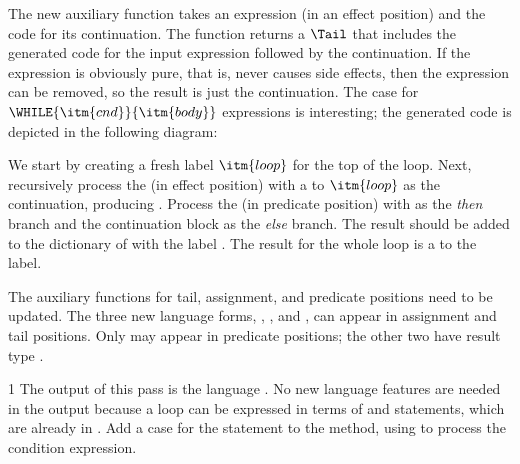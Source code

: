 \documentclass[7x10]{TimesAPriori_MIT}%
\def\pythonEd{1}
\def\edition{0}
\numberwithin{theorem}{chapter}
\numberwithin{definition}{chapter}
\numberwithin{equation}{chapter}
\begin{document}
{The new auxiliary function  takes an
expression (in an effect position) and the code for its
continuation. The function returns a $\Tail$ that includes the
generated code for the input expression followed by the
continuation. If the expression is obviously pure, that is, never
causes side effects, then the expression can be removed, so the result
is just the continuation.
%
The case for $\WHILE{\itm{cnd}}{\itm{body}}$ expressions is
interesting; the generated code is depicted in the following diagram:
\begin{center}
  \begin{minipage}{0.3\textwidth}
\end{minipage}
\end{center}
We start by creating a fresh label $\itm{loop}$ for the top of the
loop.  Next, recursively process the  (in effect position)
with a  to $\itm{loop}$ as the continuation, producing
. Process the  (in predicate position) with
 as the \emph{then} branch and the continuation block as the
\emph{else} branch. The result should be added to the dictionary of
 with the label . The result for the
whole  loop is a  to the  label.

The auxiliary functions for tail, assignment, and predicate positions
need to be updated. The three new language forms, ,
, and , can appear in assignment and tail
positions.  Only  may appear in predicate positions; the
other two have result type .

\fi}
%
{\if\edition\pythonEd
%
The output of this pass is the language \LangCIf{}. No new language
features are needed in the output because a  loop can be
expressed in terms of  and  statements, which are
already in \LangCIf{}.
%  
Add a case for the  statement to the
 method, using  to process
the condition expression.
%
\fi}
\end{document}
